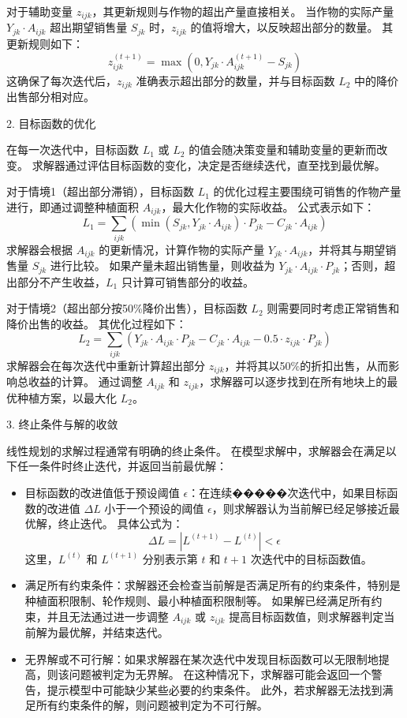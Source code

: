 \documentclass[12pt,a4paper]{nmmcm}
\begin{document}
对于辅助变量 $z_{ijk}$，其更新规则与作物的超出产量直接相关。
当作物的实际产量 $Y_{jk} \cdot A_{ijk}$ 超出期望销售量 $S_{jk}$ 时，$z_{ijk}$ 的值将增大，以反映超出部分的数量。
其更新规则如下：
\[
  z_{ijk}^{(t+1)} = \max(0, Y_{jk} \cdot A_{ijk}^{(t+1)} - S_{jk})
\]
这确保了每次迭代后，$z_{ijk}$ 准确表示超出部分的数量，并与目标函数 $L_2$ 中的降价出售部分相对应。


2. 目标函数的优化

在每一次迭代中，目标函数 $L_1$ 或 $L_2$ 的值会随决策变量和辅助变量的更新而改变。
求解器通过评估目标函数的变化，决定是否继续迭代，直至找到最优解。


对于情境1（超出部分滞销），目标函数 $L_1$ 的优化过程主要围绕可销售的作物产量进行，即通过调整种植面积 $A_{ijk}$，最大化作物的实际收益。
公式表示如下：
\[
  L_1 = \sum_{ijk} \left( \min(S_{jk}, Y_{jk} \cdot A_{ijk}) \cdot P_{jk} - C_{jk} \cdot A_{ijk} \right)
\]
求解器会根据 $A_{ijk}$ 的更新情况，计算作物的实际产量 $Y_{jk} \cdot A_{ijk}$，并将其与期望销售量 $S_{jk}$ 进行比较。
如果产量未超出销售量，则收益为 $Y_{jk} \cdot A_{ijk} \cdot P_{jk}$；否则，超出部分不产生收益，$L_1$ 只计算可销售部分的收益。


对于情境2（超出部分按50\%降价出售），目标函数 $L_2$ 则需要同时考虑正常销售和降价出售的收益。
其优化过程如下：
\[
  L_2 = \sum_{ijk} \left( Y_{jk} \cdot A_{ijk} \cdot P_{jk} - C_{jk} \cdot A_{ijk} - 0.5 \cdot z_{ijk} \cdot P_{jk} \right)
\]
求解器会在每次迭代中重新计算超出部分 $z_{ijk}$，并将其以50\%的折扣出售，从而影响总收益的计算。
通过调整 $A_{ijk}$ 和 $z_{ijk}$，求解器可以逐步找到在所有地块上的最优种植方案，以最大化 $L_2$。


3. 终止条件与解的收敛

线性规划的求解过程通常有明确的终止条件。
在模型求解中，求解器会在满足以下任一条件时终止迭代，并返回当前最优解：
\begin{itemize}
  \item 目标函数的改进值低于预设阈值 $\epsilon$：在连续�����次迭代中，如果目标函数的改进值 $\Delta L$ 小于一个预设的阈值 $\epsilon$，则求解器认为当前解已经足够接近最优解，终止迭代。
        具体公式为：
        \[
          \Delta L = |L^{(t+1)} - L^{(t)}| < \epsilon
        \]
        这里，$L^{(t)}$ 和 $L^{(t+1)}$ 分别表示第 $t$ 和 $t+1$ 次迭代中的目标函数值。


  \item 满足所有约束条件：求解器还会检查当前解是否满足所有的约束条件，特别是种植面积限制、轮作规则、最小种植面积限制等。
        如果解已经满足所有约束，并且无法通过进一步调整 $A_{ijk}$ 或 $z_{ijk}$ 提高目标函数值，则求解器判定当前解为最优解，并结束迭代。


  \item 无界解或不可行解：如果求解器在某次迭代中发现目标函数可以无限制地提高，则该问题被判定为无界解。
        在这种情况下，求解器可能会返回一个警告，提示模型中可能缺少某些必要的约束条件。
        此外，若求解器无法找到满足所有约束条件的解，则问题被判定为不可行解。

\end{itemize}
\end{document}
